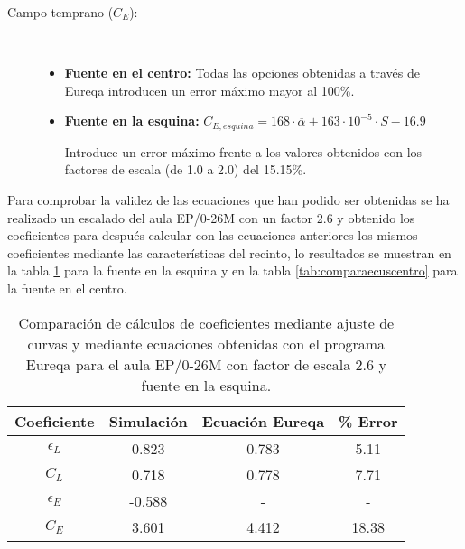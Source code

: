 \begin{description}
\item[Campo temprano ($C_E$):]~
  
  \begin{itemize}
  \item \textbf{Fuente en el centro:} Todas las opciones obtenidas a través de Eureqa introducen un error máximo mayor al 100\%.
  \item \textbf{Fuente en la esquina:} $C_{E,esquina} = 168\cdot\overline{\alpha} + 163\cdot10^{-5}\cdot S-16.9$
  
  		Introduce un error máximo frente a los valores obtenidos con los factores de escala (de 1.0 a 2.0) del 15.15\%.
\end{itemize}

\end{description}


Para comprobar la validez de las ecuaciones que han podido ser obtenidas se ha realizado un escalado del aula EP/0-26M con un factor 2.6 y obtenido los coeficientes para después calcular con las ecuaciones anteriores los mismos coeficientes mediante las características del recinto, lo resultados se muestran en la tabla \ref{tab:comparaecusesquina} para la fuente en la esquina y en la tabla \ref{tab:comparaecuscentro} para la fuente en el centro.

\begin{table}[ht]
\centering
{
\begin{tabular}{@{}cccc@{}}
\toprule
Coeficiente & Simulación & Ecuación Eureqa & \% Error \\ \midrule
$\epsilon_L$ & 0.823 & 0.783 & 5.11 \\
$C_L$ & 0.718 & 0.778 & 7.71 \\
$\epsilon_E$ & -0.588 & - & - \\
$C_E$ & 3.601 & 4.412 & 18.38 \\ \bottomrule
\end{tabular}
}
\caption{Comparación de cálculos de coeficientes mediante ajuste de curvas y mediante ecuaciones obtenidas con el programa Eureqa para el aula EP/0-26M con factor de escala 2.6 y fuente en la esquina.}
\label{tab:comparaecusesquina}
\end{table}
\FloatBarrier



